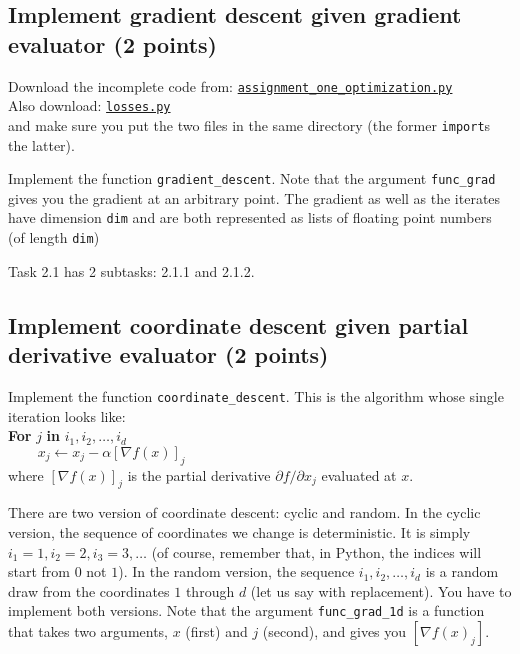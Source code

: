 \documentclass{article}
\begin{document}
\subsection{Implement gradient descent given gradient evaluator (2 points)}

Download the incomplete code from:
\href{https://github.com/ambujtewari/stats607a-fall2015/blob/master/homeworks/assignment_one_optimization.py}{\tt assignment\_one\_optimization.py} \\
Also download:
\href{https://github.com/ambujtewari/stats607a-fall2015/blob/master/homeworks/losses.py}{\tt losses.py} \\
and make sure you put the two files in the same directory (the former {\tt import}s the latter).

Implement the function {\tt gradient\_descent}. Note that the argument {\tt func\_grad} gives you the gradient at an arbitrary point. The gradient 
as well as the iterates have dimension {\tt dim} and are both represented as lists of floating point numbers (of length {\tt dim})

Task 2.1 has 2 subtasks: 2.1.1 and 2.1.2.

\subsection{Implement coordinate descent given partial derivative evaluator (2 points)}

Implement the function {\tt coordinate\_descent}. This is the algorithm whose single iteration looks like:\\

\noindent
{\bf For} $j$ {\bf in} $i_1, i_2, \ldots, i_d$ \\
$\phantom{aaaa} x_j \gets x_j - \alpha [\nabla f(x)]_j$\\

\noindent
where $[\nabla f(x)]_j$ is the partial derivative $\partial f/\partial x_j$ evaluated at $x$.

There are two version of coordinate descent: cyclic and random. In the cyclic version, the sequence of coordinates we change is deterministic. It is simply $i_1=1,
i_2=2, i_3=3, \ldots$ (of course, remember that, in Python, the indices will start from $0$ not $1$).
In the random version, the sequence $i_1, i_2, \ldots, i_d$ is a random draw from the coordinates $1$ through $d$ (let us say with replacement). You have to implement
both versions. Note that the argument {\tt func\_grad\_1d} is a function that takes two arguments, $x$ (first) and $j$ (second), and gives you $[\nabla f(x)_j]$.
\end{document}
